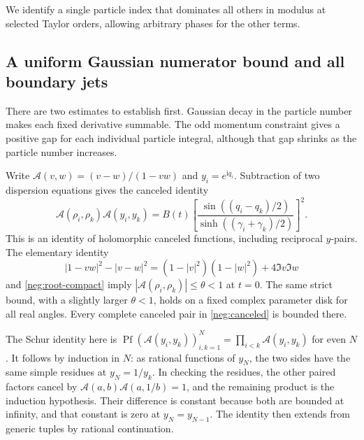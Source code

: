 \documentclass[11pt]{article}
\numberwithin{equation}{section}
\theoremstyle{definition}
\newcommand{\ii}{\mathrm i}
\begin{document}
We identify a single particle index that dominates all others in
modulus at selected Taylor orders, allowing arbitrary phases for
the other terms.

\subsection{A uniform Gaussian numerator bound and all boundary jets}
\label{neg:jets-section}

There are two estimates to establish first. Gaussian decay in the
particle number makes each fixed derivative summable. The odd
momentum constraint gives a positive gap for each individual particle
integral, although that gap shrinks as the particle number increases.

Write \(\mathcal A(v,w)=(v-w)/(1-vw)\) and \(y_i=e^{\ii q_i}\).
Subtraction of two dispersion equations gives the canceled identity
\begin{equation}
 \mathcal A(\rho_i,\rho_k)\mathcal A(y_i,y_k)
 =B(t)\left[
    \frac{\sin((q_i-q_k)/2)}
         {\sinh((\gamma_i+\gamma_k)/2)}
       \right]^2 .
 \label{neg:canceled}
\end{equation}
This is an identity of holomorphic canceled functions, including
reciprocal \(y\)-pairs.  The elementary identity
\begin{equation}
 |1-vw|^2-|v-w|^2
 =(1-|v|^2)(1-|w|^2)+4\Im v\Im w
 \label{neg:schur}
\end{equation}
and \eqref{neg:root-compact} imply
\(|\mathcal A(\rho_i,\rho_k)|\le\theta<1\) at \(t=0\).
The same strict bound, with a slightly larger \(\theta<1\), holds
on a fixed complex parameter disk for all real angles.  Every
complete canceled pair in \eqref{neg:canceled} is bounded there.

The Schur identity here is
\(\operatorname{Pf}(\mathcal A(y_i,y_k))_{i,k=1}^{N}
=\prod_{i<k}\mathcal A(y_i,y_k)\) for even \(N\).
It follows by induction in \(N\): as rational functions of \(y_N\),
the two sides have the same simple residues at \(y_N=1/y_k\).
In checking the residues, the other paired factors cancel by
\(\mathcal A(a,b)\mathcal A(a,1/b)=1\), and the remaining product
is the induction hypothesis.  Their difference is constant because
both are bounded at infinity, and that constant is zero at
\(y_N=y_{N-1}\).  The identity then extends from generic tuples
by rational continuation.
\end{document}
